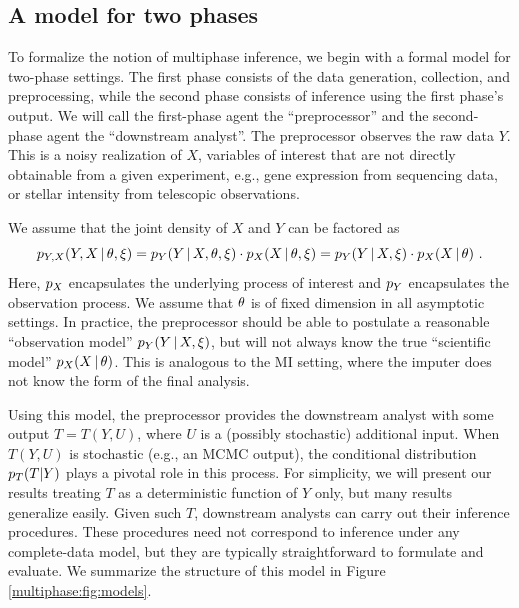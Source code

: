 \subsection{A model for two phases}
\label{multiphase:sec:model}

To formalize the notion of multiphase inference, we begin with a formal model for two-phase settings.
The first phase consists of the data generation, collection, and preprocessing, while the second phase consists of inference using the first phase's output.
We will call the first-phase agent the ``preprocessor'' and the second-phase agent the ``downstream analyst''.
The preprocessor observes the raw data $Y$.
This is a noisy realization of $X$, variables of interest that are not directly obtainable from a given experiment, e.g., gene expression from sequencing data, or stellar intensity from telescopic observations.

We assume that the joint density of $X$ and $Y$ can be factored as 
\begin{equation}\label{multiphase:e:model}
 p_{Y,X}(Y,X \given \param, \obsparam) = \pobs(Y \given X, \param, \obsparam) \cdot\psci(X \given \param, \obsparam) = \pobs(Y \given X, \obsparam) \cdot \psci(X \given \param) \ .
\end{equation}
Here, $p_X$ encapsulates the underlying process of interest and $p_Y$ encapsulates the observation process.
We assume that $\theta$ is of fixed dimension in all asymptotic settings.
In practice, the preprocessor should be able to postulate a reasonable ``observation model'' $p_Y(Y \, | \, X, \xi)$, but will not always know the true ``scientific model'' $p_X(X \, | \, \theta)$.
This is analogous to the MI setting, where the imputer does not know the form of the final analysis.

Using this model, the preprocessor provides the downstream analyst with some output $T = T(Y, U)$, where $U$ is a (possibly stochastic) additional input.
When $T(Y, U)$ is stochastic (e.g., an MCMC output), the conditional distribution $p_T(T|Y)$ plays a pivotal role in this process. For simplicity, we will present our results treating $T$ as a deterministic function of $Y$ only, but many results generalize easily.
Given such $T$, downstream analysts can carry out their inference procedures.
These procedures  need not correspond to inference under any  complete-data model, but they are typically  straightforward to formulate and evaluate.
We summarize the structure of this model in Figure \ref{multiphase:fig:models}.

